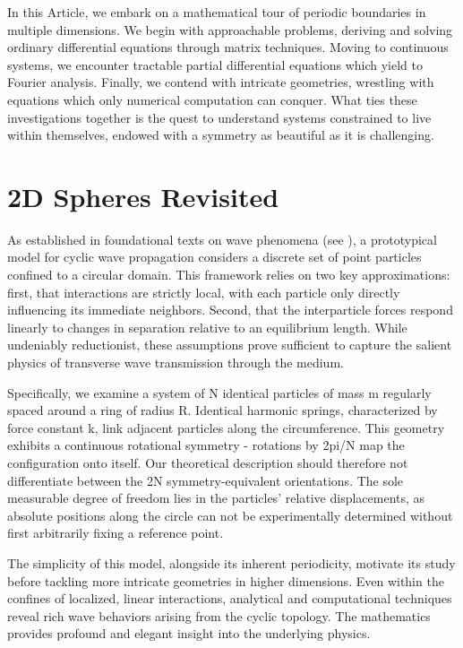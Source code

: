 \documentclass[final,5p,times,twocolumn,authoryear]{elsarticle}
\begin{document}
In this Article, we embark on a mathematical tour of periodic boundaries in multiple dimensions. We begin with approachable problems, deriving and solving ordinary differential equations through matrix techniques. Moving to continuous systems, we encounter tractable partial differential equations which yield to Fourier analysis. Finally, we contend with intricate geometries, wrestling with equations which only numerical computation can conquer. What ties these investigations together is the quest to understand systems constrained to live within themselves, endowed with a symmetry as beautiful as it is challenging.

\section{2D Spheres Revisited}
\label{sec-2D}
As established in foundational texts on wave phenomena (see \cite{georgiPhysicsWaves2015}), a prototypical model for cyclic wave propagation considers a discrete set of point particles confined to a circular domain. This framework relies on two key approximations: first, that interactions are strictly local, with each particle only directly influencing its immediate neighbors. Second, that the interparticle forces respond linearly to changes in separation relative to an equilibrium length. While undeniably reductionist, these assumptions prove sufficient to capture the salient physics of transverse wave transmission through the medium.

Specifically, we examine a system of N identical particles of mass m regularly spaced around a ring of radius R. Identical harmonic springs, characterized by force constant k, link adjacent particles along the circumference. This geometry exhibits a continuous rotational symmetry - rotations by 2pi/N map the configuration onto itself. Our theoretical description should therefore not differentiate between the 2N symmetry-equivalent orientations. The sole measurable degree of freedom lies in the particles' relative displacements, as absolute positions along the circle can not be experimentally determined without first arbitrarily fixing a reference point.

The simplicity of this model, alongside its inherent periodicity, motivate its study before tackling more intricate geometries in higher dimensions. Even within the confines of localized, linear interactions, analytical and computational techniques reveal rich wave behaviors arising from the cyclic topology. The mathematics provides profound and elegant insight into the underlying physics.
\end{document}
